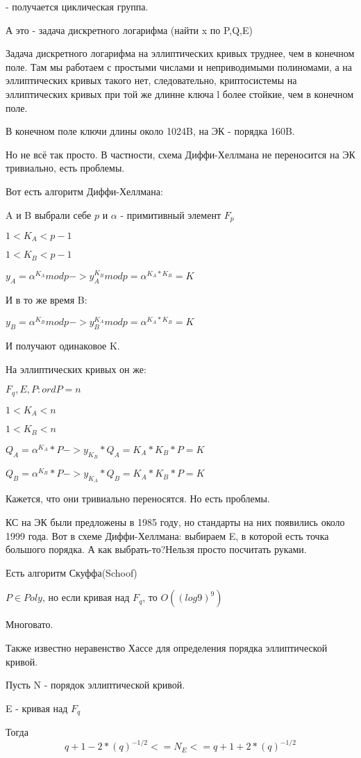 - получается циклическая группа. 

А это - задача дискретного логарифма (найти x по P,Q,E)

Задача дискретного логарифма на эллиптических кривых труднее, чем в конечном поле. Там мы работаем с простыми числами и неприводимыми полиномами, а на эллиптических кривых такого нет, следовательно, криптосистемы на эллиптических кривых при той же длинне ключа l более стойкие, чем в конечном поле. 

В конечном поле ключи длины около 1024B, на ЭК - порядка 160B.

Но не всё так просто. В частности, схема Диффи-Хеллмана не переносится на ЭК тривиально, есть проблемы. 

Вот есть алгоритм Диффи-Хеллмана:

A и B выбрали себе $p$ и $\alpha$ - примитивный элемент $F_p$

$1 < K_A < p-1$

$1 < K_B < p-1$

$y_A = \alpha^{K_A} mod p   -> y_A^{K_B}mod p = \alpha^{K_A * K_B} = K$

И в то же время B:

$y_B = \alpha^{K_B} mod p   -> y_B^{K_A}mod p = \alpha^{K_A * K_B} = K$

И получают одинаковое K.

На эллиптических кривых он же:

$F_q, E, P: ord P = n$

$1 < K_A < n$

$1 < K_B < n$

$Q_A = \alpha^{K_A}*P   -> y_{K_B}*Q_A = K_A * K_B * P = K$

$Q_B = \alpha^{K_B}*P   -> y_{K_A}*Q_B = K_A * K_B * P = K$

Кажется, что они тривиально переносятся. Но есть проблемы. 

КС на ЭК были предложены в 1985 году, но стандарты на них появились около 1999 года. 
Вот в схеме Диффи-Хеллмана: выбираем E, в которой есть точка большого порядка. А как выбрать-то?Нельзя просто посчитать руками. 

Есть алгоритм Скуффа(Schoof)

$P \in Poly$, но если кривая над $F_q$, то $O((log9)^9)$

Многовато.

Также известно неравенство Хассе для определения порядка эллиптической кривой. 
\begin{theorem}

Пусть N - порядок эллиптической кривой. 

E - кривая над $F_q$

Тогда
$$ q+1-2*(q)^{-1/2}<=N_E<=q+1+2*(q)^{-1/2} $$
\end{theorem}

